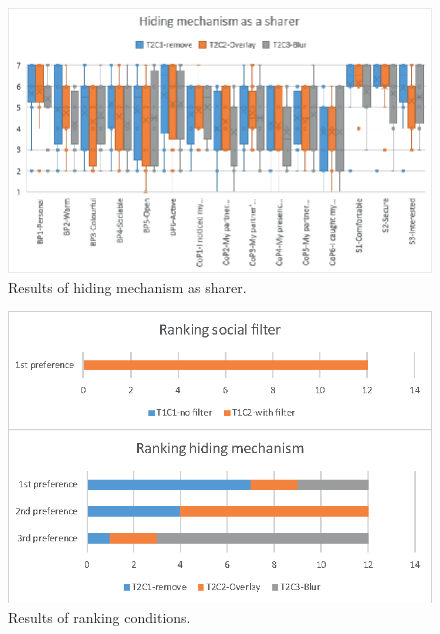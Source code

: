 \begin{figure}
\begin{center}
\includegraphics[width=.9\linewidth]{images/frontier18/images-06.eps}
\caption{Results of hiding mechanism as sharer.}\label{fig:frontier18:result-hiding-sharer}
\end{center}
\end{figure}

\begin{figure}
\begin{center}
\includegraphics[width=.8\linewidth]{images/frontier18/images-07.eps}
\caption{Results of ranking conditions.}\label{fig:frontier18:result-ranking}
\end{center}
\end{figure}
